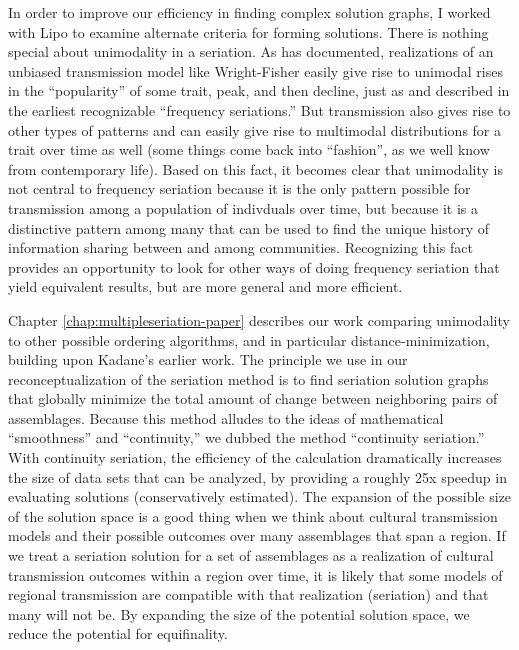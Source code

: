 In order to improve our efficiency in finding complex solution graphs, I worked with Lipo to examine alternate criteria for forming solutions. There is nothing special about unimodality in a seriation. As \citet{Neiman1990,Neiman1995}  has documented, realizations of an unbiased transmission model like Wright-Fisher easily give rise to unimodal rises in the “popularity” of some trait, peak, and then decline, just as \citet{Nelson1916} and \citet{wissler1916application} described in the earliest recognizable “frequency seriations.” But transmission also gives rise to other types of patterns and can easily give rise to multimodal distributions for a trait over time as well (some things come back into “fashion”, as we well know from contemporary life). Based on this fact, it becomes clear that unimodality is not central to frequency seriation because it is the only pattern possible for transmission among a population of indivduals over time, but because it is a distinctive pattern among many that can be used to find the unique history of information sharing between and among communities. Recognizing this fact provides an opportunity to look for other ways of doing frequency seriation that yield equivalent results, but are more general and more efficient.

Chapter \ref{chap:multipleseriation-paper} describes our work comparing unimodality to other possible ordering algorithms, and in particular distance-minimization, building upon Kadane's \citeyearpar{Kadane1971} earlier work.  The principle we use in our reconceptualization of the seriation method is to find seriation solution graphs that globally minimize the total amount of change between neighboring pairs of assemblages. Because this method alludes to the ideas of mathematical “smoothness” and “continuity,” we dubbed the method “continuity seriation.” With continuity seriation, the efficiency of the calculation dramatically increases the size of data sets that can be analyzed, by providing a roughly 25x speedup in evaluating solutions (conservatively estimated). The expansion of the possible size of the solution space is a good thing when we think about cultural transmission models and their possible outcomes over many assemblages that span a region. If we treat a seriation solution for a set of assemblages as a realization of cultural transmission outcomes within a region over time, it is likely that some models of regional transmission are compatible with that realization (seriation) and that many will not be. By expanding the size of the potential solution space, we reduce the potential for equifinality.  

